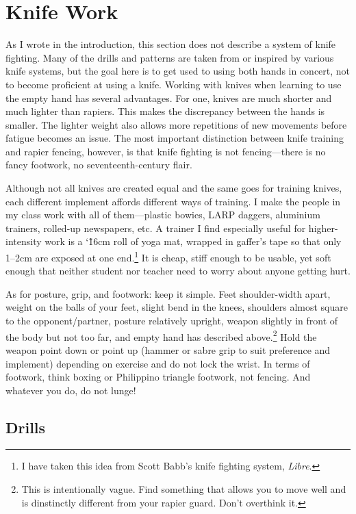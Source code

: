 \documentclass[article, 12pt, a4paper]{memoir}
\begin{document}
\chapter{Knife Work}
As I wrote in the introduction, this section does not describe a system of knife fighting.
Many of the drills and patterns are taken from or inspired by various knife systems, but the goal here is to get used to using both hands in concert, not to become proficient at using a knife.
Working with knives when learning to use the empty hand has several advantages.
For one, knives are much shorter and much lighter than rapiers.
This makes the discrepancy between the hands is smaller.
The lighter weight also allows more repetitions of new movements before fatigue becomes an issue.
The most important distinction between knife training and rapier fencing, however, is that knife fighting is not fencing---there is no fancy footwork, no seventeenth-century flair.

Although not all knives are created equal and the same goes for training knives, each different implement affords different ways of training.
I make the people in my class work with all of them---plastic bowies, LARP daggers, aluminium trainers, rolled-up newspapers, etc.
A trainer I find especially useful for higher-intensity work is a {\char`\~16cm} roll of yoga mat, wrapped in gaffer's tape so that only 1--2cm are exposed at one end.\footnote{I have taken this idea from Scott Babb's knife fighting system, \emph{Libre}.}
It is cheap, stiff enough to be usable, yet soft enough that neither student nor teacher need to worry about anyone getting hurt.

As for posture, grip, and footwork: keep it simple.
Feet shoulder-width apart, weight on the balls of your feet, slight bend in the knees, shoulders almost square to the opponent/partner, posture relatively upright, weapon slightly in front of the body but not too far, and empty hand has described above.\footnote{This is intentionally vague. Find something that allows you to move well and is dinstinctly different from your rapier guard. Don't overthink it.}
Hold the weapon point down or point up (hammer or sabre grip to suit preference and implement) depending on exercise and do not lock the wrist.
In terms of footwork, think boxing or Philippino triangle footwork, not fencing.
And whatever you do, do not lunge!

\section{Drills}
\end{document}
